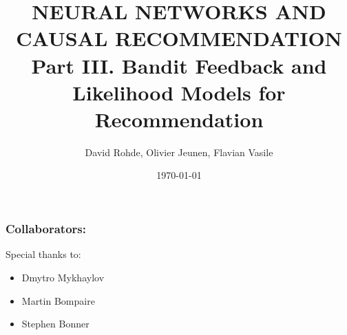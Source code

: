 \documentclass[10pt]{beamer}
\title{NEURAL NETWORKS AND CAUSAL RECOMMENDATION 
Part III. Bandit Feedback and Likelihood Models for Recommendation}
\date{\today}
\author{David Rohde, Olivier Jeunen, Flavian Vasile}
\institute{Criteo Research}
\begin{document}
\maketitle

\begin{frame}
\frametitle{Collaborators:}

Special thanks to:
\begin{itemize}
    \item Dmytro Mykhaylov
    \item Martin Bompaire
    \item Stephen Bonner
\end{itemize}

\end{frame}







%
%
%
%
%
%
%
%
%


\end{document}
